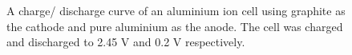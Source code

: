 \begin{itemize}
\begin{figure}[h]
\caption{A charge/ discharge curve of an aluminium ion cell using graphite as the cathode and pure aluminium as the anode. The cell was charged and discharged to 2.45 V and 0.2 V respectively.}
\label{Fig 1}
\end{figure}
    

\end{itemize}
